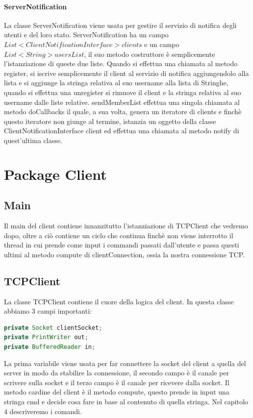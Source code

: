 \documentclass[]{article}
\begin{document}
\paragraph{ServerNotification}
\label{serverRMI} La classe ServerNotification viene usata per gestire il servizio di notifica degli utenti e del loro stato. ServerNotification ha un campo\\ $List<ClientNotificationInterface> clients$ e un campo $List<String> usersList$, il suo metodo costruttore è semplicemente l'istanziazione di queste due liste. Quando si effettua una chiamata al metodo register, si iscrive semplicemente il client al servizio di notifica aggiungendolo alla lista e si aggiunge la stringa relativa al suo username alla lista di Stringhe, quando si effettua una unregister si rimuove il client e la stringa relativa al suo username dalle liste relative.
sendMemberList effettua una singola chiamata al metodo doCallbacks il quale, a sua volta, genera un iteratore di clients e finchè questo iteratore non giunge al termine, istanzia un oggetto della classe ClientNotificationInterface client ed effettua una chiamata al metodo notify di quest'ultima classe.\newpage
\section{Package Client}
\subsection{Main}
Il main del client contiene innanzitutto l'istanziazione di TCPClient che vedremo dopo, oltre a ciò contiene un ciclo che continua finchè non viene interrotto il thread in cui prende come input i commandi passati dall'utente e passa questi ultimi al metodo compute di clientConnection, ossia la nostra connessione TCP.
\subsection{TCPClient}
La classe TCPClient contiene il cuore della logica del client. In questa classe abbiamo 3 campi importanti:
\begin{lstlisting}[language=java]
private Socket clientSocket;
private PrintWriter out;
private BufferedReader in;
\end{lstlisting}
La prima variabile viene usata per far connettere la socket del client a quella del server in modo da stabilire la connessione, il secondo campo è il canale per scrivere sulla socket e il terzo campo è il canale per ricevere dalla socket.
Il metodo cardine del client è il metodo compute, questo prende in input una stringa cmd e decide cosa fare in base al contenuto di quella stringa.
Nel capitolo 4 descriveremo i comandi.
\end{document}

